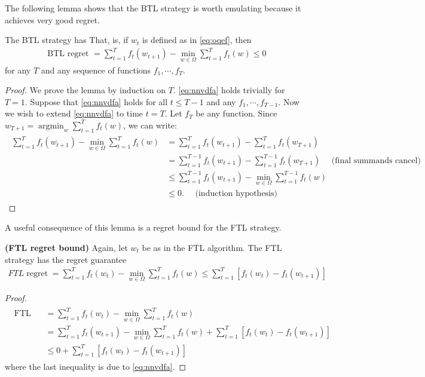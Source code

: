 \documentclass{article}
\newcommand{\bfs}[1]{\textbf{({#1}) }}
\newcommand{\re}{\operatorname{regret}}
\begin{document}
The following lemma shows that the BTL strategy is worth emulating because it achieves very good regret.
\begin{lema}
The BTL strategy has  That, is, if $w_{t}$ is defined as in \cref{eq:oqef}, then
\begin{align}
\text { BTL  regret }=\sum_{t=1}^{T} f_{t}\left(w_{t+1}\right)-\min _{w \in \Omega} \sum_{t=1}^{T} f_{t}(w) \leq 0\label{eq:nnvdfa}
\end{align}
for any $T$ and any sequence of functions $f_{1}, \cdots, f_{T}$.
\end{lema} 
\begin{proof}\color{ForestGreen}%
 We prove the lemma by induction on $T$. \cref{eq:nnvdfa} holds trivially for $T=1$. Suppose that \cref{eq:nnvdfa} holds for all $t \leq T-1$ and any $f_{1}, \cdots, f_{T-1}$. Now we wish to extend \cref{eq:nnvdfa} to time $t=T$. Let $f_{T}$ be any function. Since $w_{T+1}=\operatorname{argmin}_{w} \sum_{t=1}^{T} f_{t}(w)$, we can write:
\begin{align*}
\begin{aligned}
\sum_{t=1}^{T} f_{t}\left(w_{t+1}\right)-\min _{w \in \Omega} \sum_{t=1}^{T} f_{t}(w) &=\sum_{t=1}^{T} f_{t}\left(w_{t+1}\right)-\sum_{t=1}^{T} f_{t}\left(w_{T+1}\right) \\
&=\sum_{t=1}^{T-1} f_{t}\left(w_{t+1}\right)-\sum_{t=1}^{T-1} f_{t}\left(w_{T+1}\right) \quad \text { (final summands cancel) } \\
& \leq \sum_{t=1}^{T-1} f_{t}\left(w_{t+1}\right)-\min _{w \in \Omega} \sum_{t=1}^{T-1} f_{t}(w) \\
& \leq 0 . \quad \text { (induction hypothesis) }
\end{aligned}
\end{align*}
\end{proof}
A useful consequence of this lemma is a regret bound for the FTL strategy.
\begin{lema}\bfs{FTL regret bound}\label{lem:qwef}
Again, let $w_{t}$ be as in the FTL algorithm. The FTL strategy has the regret guarantee
\begin{align*}
F T L \re=\sum_{t=1}^{T} f_{t}\left(w_{t}\right)-\min _{w \in \Omega} \sum_{t=1}^{T} f_{t}(w) \leq \sum_{t=1}^{T}\left[f_{t}\left(w_{t}\right)-f_{t}\left(w_{t+1}\right)\right]
\end{align*}
\end{lema} 
\begin{proof}\color{ForestGreen}
 \begin{align*}
\begin{aligned}
\text { FTL regret } &=\sum_{t=1}^{T} f_{t}\left(w_{t}\right)-\min _{w \in \Omega} \sum_{t=1}^{T} f_{t}(w) \\
&=\sum_{t=1}^{T} f_{t}\left(w_{t+1}\right)-\min _{w \in \Omega} \sum_{t=1}^{T} f_{t}(w)+\sum_{t=1}^{T}\left[f_{t}\left(w_{t}\right)-f_{t}\left(w_{t+1}\right)\right] \\
& \leq 0+\sum_{t=1}^{T}\left[f_{t}\left(w_{t}\right)-f_{t}\left(w_{t+1}\right)\right]
\end{aligned}
\end{align*}
where the last inequality is due to \cref{eq:nnvdfa}.
\end{proof}
\end{document}
